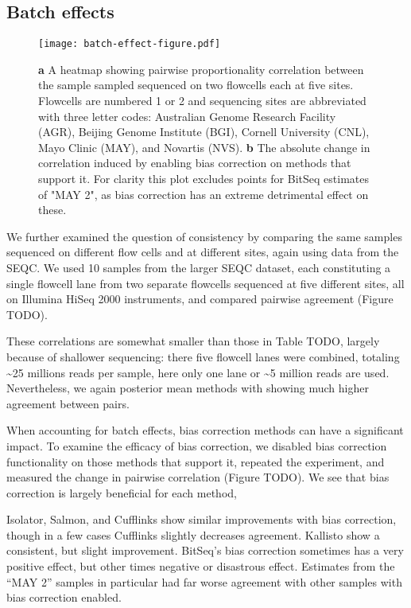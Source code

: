 \documentclass[twocolumn]{article}
\begin{document}
\subsection{Batch effects}\label{batch-effects}

\begin{figure*}
\texttt{[image: batch-effect-figure.pdf]}
\caption{
\textbf{a} A heatmap showing pairwise proportionality correlation between the sample
sampled sequenced on two flowcells each at five sites. Flowcells are numbered 1
or 2 and sequencing sites are abbreviated with three letter codes: Australian
Genome Research Facility (AGR), Beijing Genome Institute (BGI), Cornell
University (CNL), Mayo Clinic (MAY), and Novartis (NVS). \textbf{b} The absolute
change in correlation induced by enabling bias correction on methods that
support it. For clarity this plot excludes points for BitSeq estimates of "MAY
2", as bias correction has an extreme detrimental effect on these.
}
\end{figure*}

We further examined the question of consistency by comparing the same
samples sequenced on different flow cells and at different sites, again
using data from the SEQC. We used 10 samples from the larger SEQC
dataset, each constituting a single flowcell lane from two separate
flowcells sequenced at five different sites, all on Illumina HiSeq 2000
instruments, and compared pairwise agreement (Figure TODO).

These correlations are somewhat smaller than those in Table TODO,
largely because of shallower sequencing: there five flowcell lanes were
combined, totaling \textasciitilde{}25 millions reads per sample, here
only one lane or \textasciitilde{}5 million reads are used.
Nevertheless, we again posterior mean methods with showing much higher
agreement between pairs.

When accounting for batch effects, bias correction methods can have a
significant impact. To examine the efficacy of bias correction, we
disabled bias correction functionality on those methods that support it,
repeated the experiment, and measured the change in pairwise correlation
(Figure TODO). We see that bias correction is largely beneficial for
each method,

Isolator, Salmon, and Cufflinks show similar improvements with bias
correction, though in a few cases Cufflinks slightly decreases
agreement. Kallisto show a consistent, but slight improvement. BitSeq's
bias correction sometimes has a very positive effect, but other times
negative or disastrous effect. Estimates from the ``MAY 2'' samples in
particular had far worse agreement with other samples with bias
correction enabled.
\end{document}
